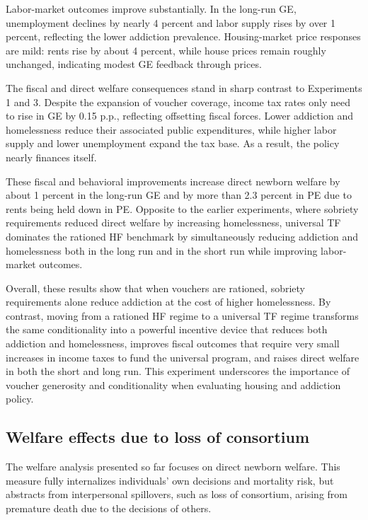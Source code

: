 \documentclass[parskip=full]{article}
\theoremstyle{plain}
\theoremstyle{definition}
\theoremstyle{remark}
\begin{document}
Labor-market outcomes improve substantially. In the long-run GE, unemployment declines by nearly 4 percent and labor supply rises by over 1 percent, reflecting the lower addiction prevalence. Housing-market price responses are mild: rents rise by about 4 percent, while house prices remain roughly unchanged, indicating modest GE feedback through prices.

The fiscal and direct welfare consequences stand in sharp contrast to Experiments 1 and 3. Despite the expansion of voucher coverage, income tax rates only need to rise in GE by 0.15 p.p., reflecting offsetting fiscal forces. Lower addiction and homelessness reduce their associated public expenditures, while higher labor supply and lower unemployment expand the tax base. As a result, the policy nearly finances itself.

These fiscal and behavioral improvements increase direct newborn welfare by about 1 percent in the long-run GE and by more than 2.3 percent in PE due to rents being held down in PE. Opposite to the earlier experiments, where sobriety requirements reduced direct welfare by increasing homelessness, universal TF dominates the rationed HF benchmark by simultaneously reducing addiction and homelessness both in the long run and in the short run while improving labor-market outcomes.

Overall, these results show that when vouchers are rationed, sobriety requirements alone reduce addiction at the cost of higher homelessness. By contrast, moving from a rationed HF regime to a universal TF regime transforms the same conditionality into a powerful incentive device that reduces both addiction and homelessness, improves fiscal outcomes that require very small increases in income taxes to fund the universal program, and raises direct welfare in both the short and long run. This experiment underscores the importance of voucher generosity and conditionality when evaluating housing and addiction policy.

\subsection{Welfare effects due to loss of consortium}\label{sec:loss_of_consortium}

The welfare analysis presented so far focuses on direct newborn welfare. This measure fully internalizes individuals’ own decisions and mortality risk, but abstracts from interpersonal spillovers, such as loss of consortium, arising from premature death due to the decisions of others.  
\end{document}
